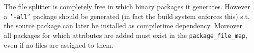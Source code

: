 \documentclass[a4paper]{scrartcl}
\begin{document}
	The file splitter is completely free in which binary packages it generates. However a \texttt{'-all'} package should be generated (in fact the build system enforces this) s.t. the source package can later be installed as compiletime dependency. Moreover all packages for which attributes are added must exist in the \texttt{package\_file\_map}, even if no files are assigned to them.
	
\end{document}
